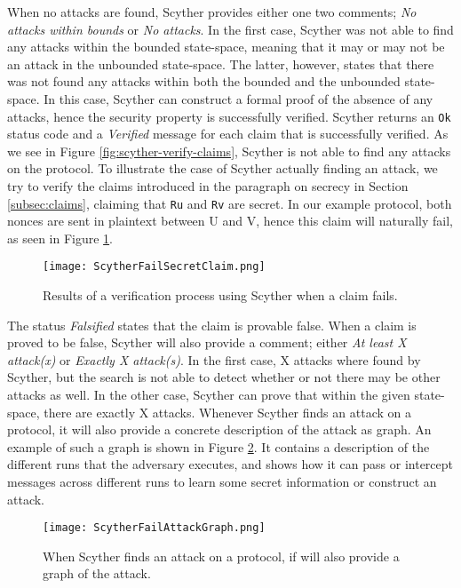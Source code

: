 When no attacks are found, Scyther provides either one two comments; \emph{No attacks within bounds} or \emph{No attacks}. In the first case, Scyther was not able to find any attacks within the bounded state-space, meaning that it may or may not be an attack in the unbounded state-space. The latter, however, states that there was not found any attacks within both the bounded and the unbounded state-space. In this case, Scyther can construct a formal proof of the absence of any attacks, hence the security property is successfully verified. Scyther returns an \texttt{Ok} status code and a \emph{Verified} message for each claim that is successfully verified. As we see in Figure \ref{fig:scyther-verify-claims}, Scyther is not able to find any attacks on the protocol. To illustrate the case of Scyther actually finding an attack, we try to verify the claims introduced in the paragraph on secrecy in Section \ref{subsec:claims}, claiming that \texttt{Ru} and \texttt{Rv} are secret. In our example protocol, both nonces are sent in plaintext between U and V, hence this claim will naturally fail, as seen in Figure \ref{fig:scyther-verify-claims-fail}.


\begin{figure}[h]
	\centering
	\texttt{[image: ScytherFailSecretClaim.png]}
	\caption{Results of a verification process using Scyther when a claim fails.}
	\label{fig:scyther-verify-claims-fail}
\end{figure}

The status \emph{Falsified} states that the claim is provable false. When a claim is proved to be false, Scyther will also provide a comment; either \emph{At least X attack(x)} or \emph{Exactly X attack(s)}. In the first case, X attacks where found by Scyther, but the search is not able to detect whether or not there may be other attacks as well. In the other case, Scyther can prove that within the given state-space, there are exactly X attacks. Whenever Scyther finds an attack on a protocol, it will also provide a concrete description of the attack as graph. An example of such a graph is shown in Figure \ref{fig:scyther-graph}. It contains a description of the different runs that the adversary executes, and shows how it can pass or intercept messages across different runs to learn some secret information or construct an attack.

\begin{figure}[h]
	\centering
	\texttt{[image: ScytherFailAttackGraph.png]}
	\caption{When Scyther finds an attack on a protocol, if will also provide a graph of the attack.}
	\label{fig:scyther-graph}
\end{figure}
